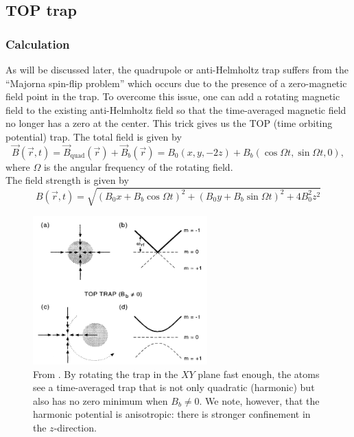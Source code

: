 \documentclass{book}
\theoremstyle{definition}
\begin{document}
\subsection*{TOP trap}


\subsubsection*{Calculation}

As will be discussed later, the quadrupole or anti-Helmholtz trap suffers from the ``Majorna spin-flip problem'' which occurs due to the presence of a zero-magnetic field point in the trap. To overcome this issue, one can add a rotating magnetic field to the existing anti-Helmholtz field so that the time-averaged magnetic field no longer has a zero at the center. This trick gives us the TOP (time orbiting potential) trap. The total field is given by 
\begin{equation*}
\vec{B}(\vec{r},t) = \vec{B}_\text{quad}(\vec{r}) + \vec{B}_b(\vec{r}) = B_0 (x,y,-2z) + B_b(\cos\Omega t, \sin\Omega t,0),
\end{equation*} 
where $\Omega$ is the angular frequency of the rotating field. \\


The field strength is given by 
\begin{equation*}
B(\vec{r},t) = \sqrt{(B_0 x + B_b\cos\Omega t)^2 + (B_0 y + B_b\sin\Omega t)^2 + 4 B_0^2 z^2 }
\end{equation*}

\begin{figure}[!htb]
	\centering
	\includegraphics[width=0.6\textwidth]{images/TOP_trap.png}
	\caption{From \cite{PhysRevLett.74.3352}. By rotating the trap in the $XY$ plane fast enough, the atoms see a time-averaged trap that is not only quadratic (harmonic) but also has no zero minimum when $B_b \neq 0$. We note, however, that the harmonic potential is anisotropic: there is stronger confinement in the $z$-direction.}
	\label{fig:cornell}
\end{figure}
\end{document}
